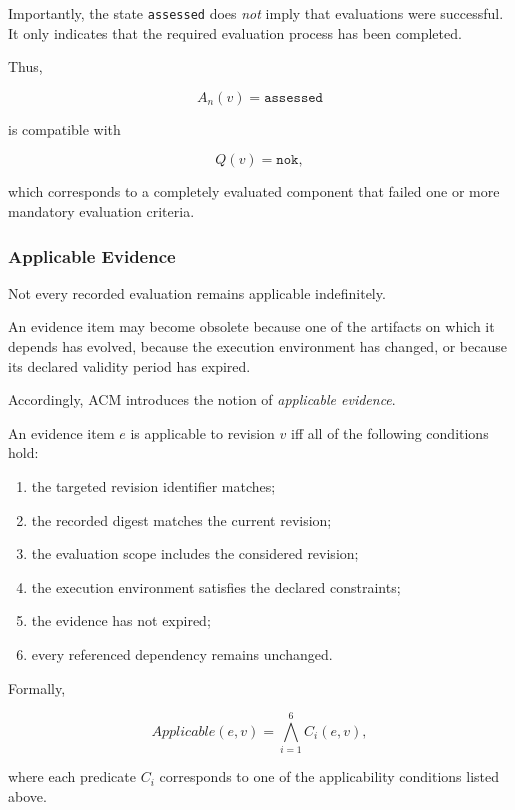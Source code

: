 \documentclass[10pt]{article}
\begin{document}
Importantly, the state
\texttt{assessed}
does \emph{not} imply that evaluations were successful.
It only indicates that the required evaluation process has been completed.

Thus,

\[
A_n(v)=\texttt{assessed}
\]

is compatible with

\[
Q(v)=\texttt{nok},
\]

which corresponds to a completely evaluated component that failed one or more
mandatory evaluation criteria.


\subsubsection{Applicable Evidence}

Not every recorded evaluation remains applicable indefinitely.

An evidence item may become obsolete because one of the artifacts on which it
depends has evolved, because the execution environment has changed, or because
its declared validity period has expired.

Accordingly, ACM introduces the notion of
\emph{applicable evidence}.

An evidence item
\(e\)
is applicable to revision
\(v\)
iff all of the following conditions hold:

\begin{enumerate}
    \item the targeted revision identifier matches;
    \item the recorded digest matches the current revision;
    \item the evaluation scope includes the considered revision;
    \item the execution environment satisfies the declared constraints;
    \item the evidence has not expired;
    \item every referenced dependency remains unchanged.
\end{enumerate}

Formally,

\begin{equation}
Applicable(e,v)
=
\bigwedge_{i=1}^{6}
C_i(e,v),
\label{eq:applicable_evidence}
\end{equation}

where each predicate
\(C_i\)
corresponds to one of the applicability conditions listed above.
\end{document}
